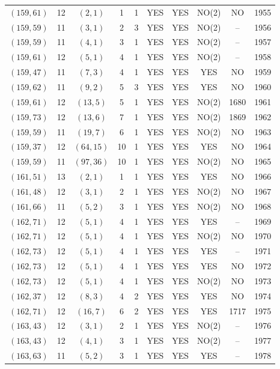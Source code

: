 \begin{longtable}{|c|c|c|c|c|c|c|c|c|c|}
$(159, 61)$ & 12 & $(2, 1)$ & 1 & 1 & YES & YES & NO(2) & NO & 1955\\
$(159, 59)$ & 11 & $(3, 1)$ & 2 & 3 & YES & YES & NO(2) & -- & 1956\\
$(159, 59)$ & 11 & $(4, 1)$ & 3 & 1 & YES & YES & NO(2) & -- & 1957\\
$(159, 61)$ & 12 & $(5, 1)$ & 4 & 1 & YES & YES & NO(2) & -- & 1958\\
$(159, 47)$ & 11 & $(7, 3)$ & 4 & 1 & YES & YES & YES & NO & 1959\\
$(159, 62)$ & 11 & $(9, 2)$ & 5 & 3 & YES & YES & YES & NO & 1960\\
$(159, 61)$ & 12 & $(13, 5)$ & 5 & 1 & YES & YES & NO(2) & 1680 & 1961\\
$(159, 73)$ & 12 & $(13, 6)$ & 7 & 1 & YES & YES & NO(2) & 1869 & 1962\\
$(159, 59)$ & 11 & $(19, 7)$ & 6 & 1 & YES & YES & NO(2) & NO & 1963\\
$(159, 37)$ & 12 & $(64, 15)$ & 10 & 1 & YES & YES & YES & NO & 1964\\
$(159, 59)$ & 11 & $(97, 36)$ & 10 & 1 & YES & YES & NO(2) & NO & 1965\\
$(161, 51)$ & 13 & $(2, 1)$ & 1 & 1 & YES & YES & YES & NO & 1966\\
$(161, 48)$ & 12 & $(3, 1)$ & 2 & 1 & YES & YES & NO(2) & NO & 1967\\
$(161, 66)$ & 11 & $(5, 2)$ & 3 & 1 & YES & YES & NO(2) & NO & 1968\\
$(162, 71)$ & 12 & $(5, 1)$ & 4 & 1 & YES & YES & YES & -- & 1969\\
$(162, 71)$ & 12 & $(5, 1)$ & 4 & 1 & YES & YES & NO(2) & NO & 1970\\
$(162, 73)$ & 12 & $(5, 1)$ & 4 & 1 & YES & YES & YES & -- & 1971\\
$(162, 73)$ & 12 & $(5, 1)$ & 4 & 1 & YES & YES & YES & NO & 1972\\
$(162, 73)$ & 12 & $(5, 1)$ & 4 & 1 & YES & YES & NO(2) & NO & 1973\\
$(162, 37)$ & 12 & $(8, 3)$ & 4 & 2 & YES & YES & YES & NO & 1974\\
$(162, 71)$ & 12 & $(16, 7)$ & 6 & 2 & YES & YES & YES & 1717 & 1975\\
$(163, 43)$ & 12 & $(3, 1)$ & 2 & 1 & YES & YES & NO(2) & -- & 1976\\
$(163, 43)$ & 12 & $(4, 1)$ & 3 & 1 & YES & YES & NO(2) & -- & 1977\\
$(163, 63)$ & 11 & $(5, 2)$ & 3 & 1 & YES & YES & YES & -- & 1978\\

\end{longtable}
